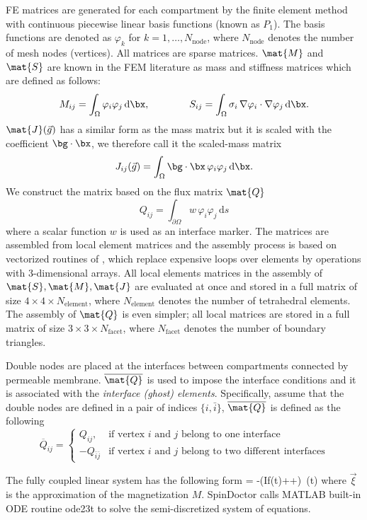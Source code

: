 FE matrices are generated for each compartment by the finite element method with continuous piecewise linear basis functions (known as $P_1$). The basis functions are denoted as $\varphi_k$ for $k=1,\dots, N_\text{node}$, where $N_\text{node}$ denotes the number of mesh nodes (vertices). All matrices are sparse matrices. $\mat{M}$ and $\mat{S}$ are known in the FEM literature as mass and stiffness matrices which are defined as follows:
\begin{equation*}
    M_{ij} =\int_\Omega \varphi_i \varphi_j \,\mathrm{d}\bx, \qquad \qquad S_{ij} =\int_\Omega \sigma_{i}\,\nabla \varphi_i \cdot \nabla \varphi_j \,\mathrm{d}\bx.
\end{equation*}
$\mat{J}(\vec{g})$ has a similar form as the mass matrix but it is scaled with the coefficient $\bg\cdot\bx$, we therefore call it the scaled-mass matrix
\begin{equation*}
    J_{ij}(\vec{g}) = \int_\Omega \bg\cdot\bx\, \varphi_i \varphi_j \,\mathrm{d}\bx.
\end{equation*}
We construct the matrix based on the flux matrix $\mat{Q}$
\begin{equation*}
    Q_{ij} = \int_{\partial \Omega} w \,\varphi_i \varphi_j \,\mathrm{d}s
\end{equation*}
where a scalar function $w$ is used as an interface marker. The matrices are assembled from local element matrices and the assembly process is based on vectorized routines of \cite{RahmanValdman2013}, which replace expensive loops over elements by operations with 3-dimensional arrays. All local elements matrices in the assembly of $\mat{S}, \mat{M}, \mat{J}$ are evaluated at once and stored in a full matrix of size $4 \times 4 \times N_\text{element}$, where $N_\text{element}$ denotes the number of tetrahedral elements. The assembly of $\mat{Q}$ is even simpler; all local matrices are stored in a full matrix of size $3 \times 3 \times N_\text{facet}$, where $N_\text{facet}$ denotes the number of boundary triangles.

Double nodes are placed at the interfaces between compartments connected by permeable membrane. $\overline{\mat{Q}}$ is used to impose the interface conditions and it is associated with the {\it interface (ghost) elements}. Specifically, assume that the double nodes are defined in a pair of indices $\{i,\bar{i}\}$, $\overline{\mat{Q}}$ is defined as the following
\begin{equation*}
    \overline{Q}_{ij} =
    \begin{cases}
        Q_{ij},             & \mbox{if vertex $i$ and $j$ belong to one interface}            \\
        -Q_{\bar{i}\bar{j}} & \mbox{if vertex $i$ and $j$ belong to two different interfaces}
    \end{cases}
\end{equation*}

The fully coupled linear system has the following form
  = -\Bigl(I\gamma f(t)++\Bigl)\, \vec{\xi}(t)
\ee
where $\vec{\xi}$ is the approximation of the magnetization $M$. SpinDoctor calls MATLAB built-in ODE routine ode23t to solve the semi-discretized system of equations.
